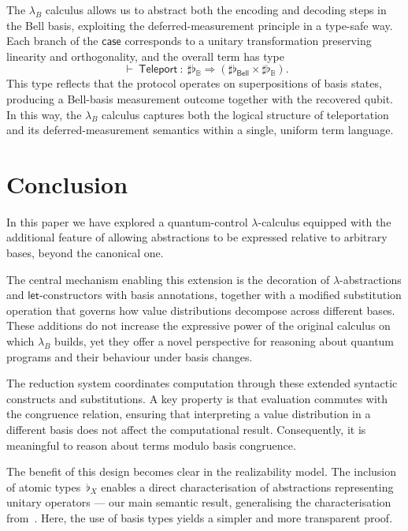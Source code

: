 \documentclass[runningheads,orivec,envcountsame,envcountsect]{llncs}
\def\Arr{\Rightarrow}
\def\TYP#1#2#3{#1~{\vdash}~#2~{:}~#3}
\newcommand\B{\mathbb B}
\newcommand{\Bell}{\mathsf{Bell}}
\newcommand{\lambdaB}{\lambda_B}
\newcommand\basis[1]{\ensuremath{\flat_{#1}}}
\begin{document}
The $\lambdaB$ calculus allows us to abstract both the encoding and decoding
steps in the Bell basis, exploiting the deferred-measurement principle in a
type-safe way.  
Each branch of the $\mathsf{case}$ corresponds to a unitary transformation
preserving linearity and orthogonality, and the overall term has type
\[
  \TYP{}{\mathsf{Teleport}}
  {\sharp\basis{\B}\Arr(\sharp\basis{\Bell}\times\sharp\basis{\B})}.
\]
This type reflects that the protocol operates on superpositions of basis
states, producing a Bell-basis measurement outcome together with the recovered
qubit.  
In this way, the $\lambdaB$ calculus captures both the logical structure of
teleportation and its deferred-measurement semantics within a single, uniform
term language.

\section{Conclusion}\label{sec:conclusion}

In this paper we have explored a quantum-control $\lambda$-calculus equipped
with the additional feature of allowing abstractions to be expressed relative
to arbitrary bases, beyond the canonical one.  

The central mechanism enabling this extension is the decoration of
$\lambda$-ab\-strac\-tions and $\mathsf{let}$-constructors with basis annotations,
together with a modified substitution operation that governs how value
distributions decompose across different bases.  
These additions do not increase the expressive power of the original calculus
on which $\lambdaB$ builds, yet they offer a novel perspective for reasoning
about quantum programs and their behaviour under basis changes.

The reduction system coordinates computation through these extended syntactic
constructs and substitutions.  
A key property is that evaluation commutes with the congruence relation,
ensuring that interpreting a value distribution in a different basis does not
affect the computational result.  
Consequently, it is meaningful to reason about terms modulo basis
congruence.

The benefit of this design becomes clear in the realizability model.
The inclusion of atomic types~$\basis{X}$ enables a direct characterisation of
abstractions representing unitary operators --- our main semantic result,
generalising the characterisation from~\cite{DiazcaroGuillermoMiquelValironLICS19}.  
Here, the use of basis types yields a simpler and more transparent proof.  
\end{document}
